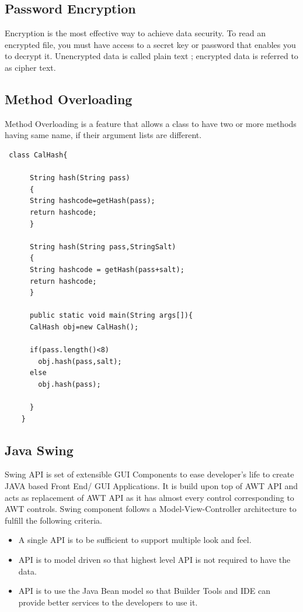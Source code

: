 \documentclass[a4paper,12pt]{article}
\begin{document}
\subsection{Password Encryption}
Encryption is the most effective way to achieve data security. To read an encrypted file, you must have access to a secret key or password that enables you to decrypt it. Unencrypted data is called plain text ; encrypted data is referred to as cipher text.	\\

\subsection{Method Overloading}
Method Overloading is a feature that allows a class to have two or more methods having same name, if their argument lists are different.
\newline
\newline
\newline
\begin{verbatim}
 class CalHash{  
    
      String hash(String pass)
      {
      String hashcode=getHash(pass);
      return hashcode;
      }  
      
      String hash(String pass,StringSalt)
      {
      String hashcode = getHash(pass+salt);
      return hashcode;
      }  
      
      public static void main(String args[]){  
      CalHash obj=new CalHash();
      
      if(pass.length()<8)
        obj.hash(pass,salt); 
      else
        obj.hash(pass);  
      
      }  
    }  

\end{verbatim}
    

\subsection{Java Swing}
Swing API is set of extensible GUI Components to ease developer's life to create JAVA based Front End/ GUI Applications. It is build upon top of AWT API and acts as replacement of AWT API as it has almost every control corresponding to AWT controls. Swing component follows a Model-View-Controller architecture to fulfill the following criteria.
\begin{itemize}
  \item  A single API is to be sufficient to support multiple look and feel.

   \item API is to model driven so that highest level API is not required to have the data.

   \item API is to use the Java Bean model so that Builder Tools and IDE can provide better services to the developers to use it.
\end{itemize}
\end{document}
